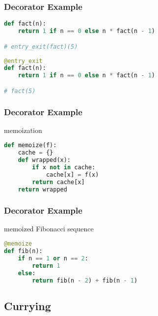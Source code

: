 \documentclass[dvipsnames]{beamer}
\theoremstyle{plain}
\begin{document}
\begin{frame}[fragile]
  \frametitle{Decorator Example}

  \begin{exampleblock}{}
    \begin{lstlisting}[language=Python]
def fact(n):
    return 1 if n == 0 else n * fact(n - 1)

# entry_exit(fact)(5)
    \end{lstlisting}

    \pause
    \medskip
    \begin{lstlisting}[language=Python]
@entry_exit
def fact(n):
    return 1 if n == 0 else n * fact(n - 1)

# fact(5)
    \end{lstlisting}
  \end{exampleblock}
\end{frame}

\begin{frame}[fragile]
  \frametitle{Decorator Example}

  \begin{exampleblock}{memoization}
    \begin{lstlisting}[language=Python]
def memoize(f):
    cache = {}
    def wrapped(x):
        if x not in cache:
            cache[x] = f(x)
        return cache[x]
    return wrapped
    \end{lstlisting}
  \end{exampleblock}
\end{frame}

\begin{frame}[fragile]
  \frametitle{Decorator Example}

  \begin{exampleblock}{memoized Fibonacci sequence}
    \begin{lstlisting}[language=Python]
@memoize
def fib(n):
    if n == 1 or n == 2:
        return 1
    else:
        return fib(n - 2) + fib(n - 1)
    \end{lstlisting}
  \end{exampleblock}
\end{frame}

\subsection{Currying}
\end{document}
